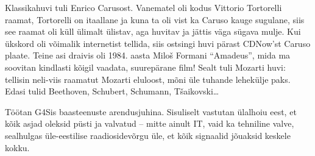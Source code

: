 
Klassikahuvi tuli Enrico Carusost. Vanematel oli kodus 
Vittorio Tortorelli raamat, Tortorelli on itaallane ja kuna ta oli vist ka
Caruso kauge sugulane, siis see raamat 
oli küll ülimalt ülistav, aga huvitav ja jättis väga sügava mulje. 
Kui ükskord oli võimalik internetist tellida, siis ostsingi huvi pärast 
CDNow'st Caruso plaate. Teine asi draivis oli 1984. aasta 
Miloš Formani \enquote{Amadeus}, mida ma soovitan kindlasti kõigil vaadata, suurepärane 
film! Sealt tuli Mozarti huvi: tellisin neli-viis
raamatut Mozarti eluloost, mõni üle tuhande 
lehekülje paks. Edasi tulid Beethoven, Schubert, 
Schumann, Tšaikovski\ldots


Töötan G4Sis baasteenuste arendusjuhina. 
Sisuliselt vastutan ülalhoiu eest, et kõik asjad oleksid püsti ja valvatud -- mitte ainult IT, vaid ka tehniline valve, sealhulgas 
üle-eestilise raadiosidevõrgu üle, et kõik signaalid jõuaksid keskele kokku.
